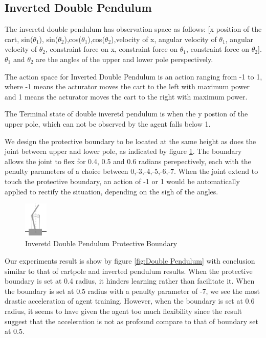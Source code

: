 \documentclass[journal]{IEEEtran}
\begin{document}
\subsection{Inverted Double Pendulum}
The inveretd double pendulum has observation space as follows: [x position of the cart, sin($\theta_1$), sin($\theta_2$),cos($\theta_1$),cos($\theta_2$),velocity of x, angular velocity of $\theta_1$, angular velocity of $\theta_2$, constraint force on x, constraint force on $\theta_1$, constraint force on $\theta_2$]. $\theta_1$ and $\theta_2$ are the angles of the upper and lower pole perspectively.

The action space for Inverted Double Pendulum is an action ranging from -1 to 1, where -1 means the acturator moves the cart to the left with maximum power and 1 means the acturator moves the cart to the right with maximum power.

The Terminal state of double inveretd pendulum is when the y postion of the upper pole, which can not be observed by the agent falls below 1.

We design the protective boundary to be located at the same height as does the joint between upper and lower pole, as indicated by figure \ref{fig:doublePB}. The boundary allows the joint to flex for 0.4, 0.5 and 0.6 radians perepectively, each with the penulty parameters of a choice between 0,-3,-4,-5,-6,-7. When the joint extend to touch the protective boundary, an action of -1 or 1 would be automatically applied to rectify the situation, depending on the sigh of the angles.

\begin{figure}
     \centering
      \includegraphics[width=0.1\textwidth]{cartpole2.png}
      \caption{Inveretd Double Pendulum Protective Boundary}
      \label{fig:doublePB}
\end{figure}

Our experiments result is show by figure \ref{fig:Double Pendulum} with conclusion similar to that of cartpole and inverted pendulum results. When the protective boundary is set at 0.4 radius, it hinders learning rather than facilitate it. When the boundary is set at 0.5 radius with a penulty parameter of -7, we see the most drastic acceleration of agent training. However, when the boundary is set at 0.6 radius, it seems to have given the agent too much flexibility since the result suggest that the acceleration is not as profound compare to that of boundary set at 0.5.
\end{document}
